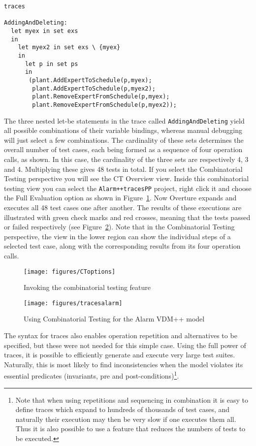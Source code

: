 \begin{lstlisting}
traces

AddingAndDeleting:
  let myex in set exs
  in
    let myex2 in set exs \ {myex}
    in
      let p in set ps
      in
       (plant.AddExpertToSchedule(p,myex);
        plant.AddExpertToSchedule(p,myex2);
        plant.RemoveExpertFromSchedule(p,myex);
        plant.RemoveExpertFromSchedule(p,myex2));
\end{lstlisting}

\noindent The three nested let-be statements in the trace called \texttt{AddingAndDeleting} yield all possible combinations of their variable bindings, whereas manual debugging will just select a few combinations.  The cardinality of these sets determines the overall number of test cases, each being formed as a sequence of four operation calls, as shown. In this case, the cardinality of the three sets are respectively 4, 3 and 4. Multiplying these gives 48 tests in total. If you select the Combinatorial Testing perspective you will see the \textsf{CT Overview} view. Inside this combinatorial testing view you can select the \texttt{Alarm++tracesPP} project, right click it and choose the \textsf{Full Evaluation} option as shown in Figure~\ref{fig:CToptions}. Now Overture expands and executes all 48 test cases one after another. The results of these executions are illustrated with green check marks and red crosses, meaning that the tests passed or failed respectively (see Figure~\ref{fig:stracesalarm}). Note that in the Combinatorial Testing perspective, the view in the lower region can show the individual steps of a selected test case, along with the corresponding results from its four operation calls.
%
\begin{figure}[htbp]
\begin{center}
\texttt{[image: figures/CToptions]}
\caption{Invoking the combinatorial testing feature\label{fig:CToptions}}
\end{center}
\end{figure}
%
\begin{figure}[htbp]
\begin{center}
\texttt{[image: figures/tracesalarm]}
\caption{Using Combinatorial Testing for the Alarm VDM++ model\label{fig:stracesalarm}}
\end{center}
\end{figure}
%
The syntax for traces also enables operation repetition and alternatives to be specified, but these were not needed for this simple case. Using the full power of traces, it is possible to efficiently generate and execute very large test suites. Naturally, this is most likely to find inconsistencies when the model violates its essential predicates (invariants, pre and post-conditions)\footnote{Note that when using repetitions and sequencing in combination it is easy to define traces which expand to hundreds of thousands of test cases, and naturally their execution may then be very slow if one executes them all. Thus it is also possible to use a feature that reduces the numbers of tests to be executed.}.
%
